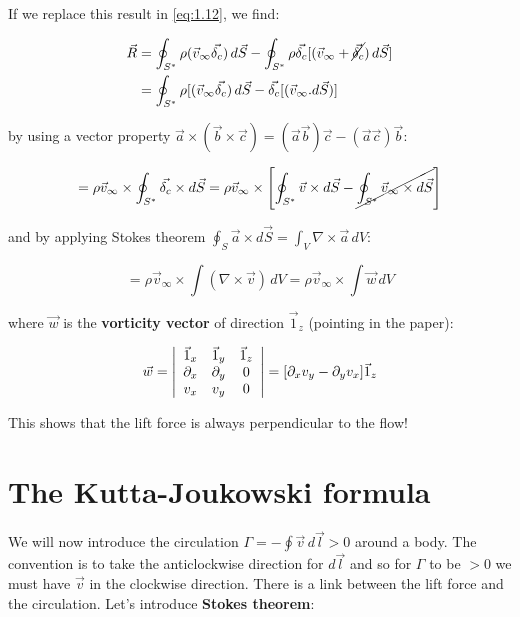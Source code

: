 			If we replace this result in \eqref{eq:1.12}, we find:
			
			\begin{equation}
			\begin{aligned}
			\vec{R} &= \oint _{S^*} \rho (\vec{v}_\infty \vec{\delta _c} ) \, d\vec{S} - \oint _{S^*} \rho \vec{\delta _c} [(\vec{v}_\infty + \cancel{\vec{\delta _c}} ) \, d\vec{S}] \\
			&=\oint _{S^*} \rho [(\vec{v}_\infty \vec{\delta _c}) \, d\vec{S} - \vec{\delta _c} [(\vec{v}_\infty . d\vec{S})]
			\end{aligned}
			\end{equation}
			
			by using a vector property $\vec{a} \times (\vec{b} \times \vec{c}) = (\vec{a} \vec{b})\vec{c} - (\vec{a}\vec{c})\vec{b}$:
			
			\begin{equation}
			= \rho \vec{v}_\infty \times \oint _{S^*} \vec{\delta _c} \times d\vec{S} = \rho \vec{v}_\infty \times \left[\oint _{S^*} \vec{v} \times d\vec{S} - \cancel{\oint _{S^*} \vec{v}_\infty \times d\vec{S}}\right]
			\end{equation}
			
			and by applying Stokes theorem $\oint _S \vec{a} \times d\vec{S} = \int _V \nabla \times \vec{a} \, dV$:
			
			\begin{equation}
			= \rho \vec{v}_\infty \times \int  (\nabla \times \vec{v})\, dV = \rho \vec{v}_\infty \times \int  \vec{w}\, dV
			\end{equation}
			
			where $\vec{w}$ is the \textbf{vorticity vector} of direction $\vec{1}_z$ (pointing in the paper):
			
			\begin{equation}
			\vec{w} = 
			\left| \begin{array}{ccc}
			\vec{1}_x & \vec{1}_y & \vec{1}_z \\ 
			\D _x & \D _y & 0 \\ 
			v_x & v_y & 0
			\end{array} 
			\right| 
			= [\D _x v_y - \D _y v_x] \vec{1}_z
			\end{equation}
			
			This shows that the lift force is always perpendicular to the flow!
		
	\section{The Kutta-Joukowski formula}
		We will now introduce the circulation $\Gamma = - \oint \vec{v} \, d\vec{l} >0$   around a body. The convention is to take the anticlockwise direction for $d\vec{l}$ and so for $\Gamma$ to be $>0$ we must have $\vec{v}$ in the clockwise direction. There is a link between the lift force and the circulation. Let's introduce \textbf{Stokes theorem}:
		

